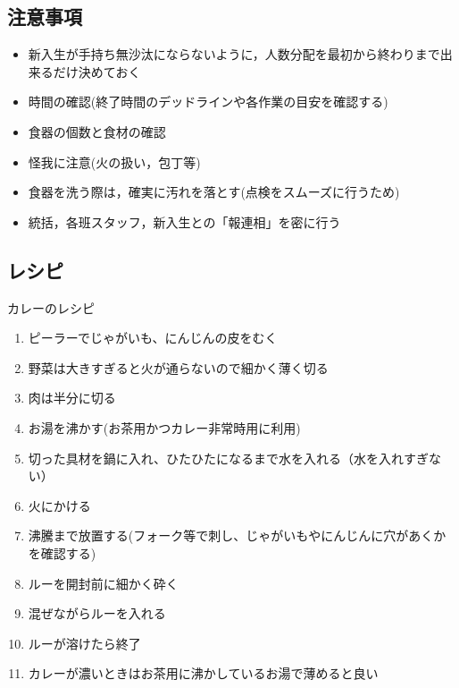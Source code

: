 \subsection{注意事項}
\begin{itemize}
  \item 新入生が手持ち無沙汰にならないように，人数分配を最初から終わりまで出来るだけ決めておく
  \item 時間の確認(終了時間のデッドラインや各作業の目安を確認する)
  \item 食器の個数と食材の確認
  \item 怪我に注意(火の扱い，包丁等)
  \item 食器を洗う際は，確実に汚れを落とす(点検をスムーズに行うため)
  \item 統括，各班スタッフ，新入生との「報連相」を密に行う
\end{itemize}

\subsection{レシピ}
\begin{itembox}[l]{カレーのレシピ}
  \begin{enumerate}
    \item ピーラーでじゃがいも、にんじんの皮をむく
    \item 野菜は大きすぎると火が通らないので細かく薄く切る
    \item 肉は半分に切る
    \item お湯を沸かす(お茶用かつカレー非常時用に利用)
    \item 切った具材を鍋に入れ、ひたひたになるまで水を入れる（水を入れすぎない）
    \item 火にかける
    \item 沸騰まで放置する(フォーク等で刺し、じゃがいもやにんじんに穴があくかを確認する)
    \item ルーを開封前に細かく砕く
    \item 混ぜながらルーを入れる
    \item ルーが溶けたら終了
    \item カレーが濃いときはお茶用に沸かしているお湯で薄めると良い
  \end{enumerate}
\end{itembox}

